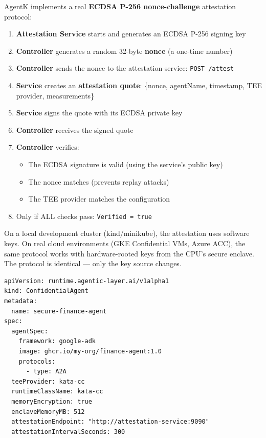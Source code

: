 \documentclass[12pt,a4paper,openany]{report}
\begin{document}
AgentK implements a real \textbf{ECDSA P-256 nonce-challenge} attestation protocol:

\begin{enumerate}
    \item \textbf{Attestation Service} starts and generates an ECDSA P-256 signing key
    \item \textbf{Controller} generates a random 32-byte \textbf{nonce} (a one-time number)
    \item \textbf{Controller} sends the nonce to the attestation service: \texttt{POST /attest}
    \item \textbf{Service} creates an \textbf{attestation quote}: \{nonce, agentName, timestamp, TEE provider, measurements\}
    \item \textbf{Service} signs the quote with its ECDSA private key
    \item \textbf{Controller} receives the signed quote
    \item \textbf{Controller} verifies:
    \begin{itemize}
        \item The ECDSA signature is valid (using the service's public key)
        \item The nonce matches (prevents replay attacks)
        \item The TEE provider matches the configuration
    \end{itemize}
    \item Only if ALL checks pass: \texttt{Verified = true}
\end{enumerate}

\begin{warningbox}
On a local development cluster (kind/minikube), the attestation uses software keys. On real cloud environments (GKE Confidential VMs, Azure ACC), the same protocol works with hardware-rooted keys from the CPU's secure enclave. The protocol is identical — only the key source changes.
\end{warningbox}

\begin{lstlisting}[style=yaml, caption={A confidential agent with TEE}]
apiVersion: runtime.agentic-layer.ai/v1alpha1
kind: ConfidentialAgent
metadata:
  name: secure-finance-agent
spec:
  agentSpec:
    framework: google-adk
    image: ghcr.io/my-org/finance-agent:1.0
    protocols:
      - type: A2A
  teeProvider: kata-cc
  runtimeClassName: kata-cc
  memoryEncryption: true
  enclaveMemoryMB: 512
  attestationEndpoint: "http://attestation-service:9090"
  attestationIntervalSeconds: 300
\end{lstlisting}
\end{document}
